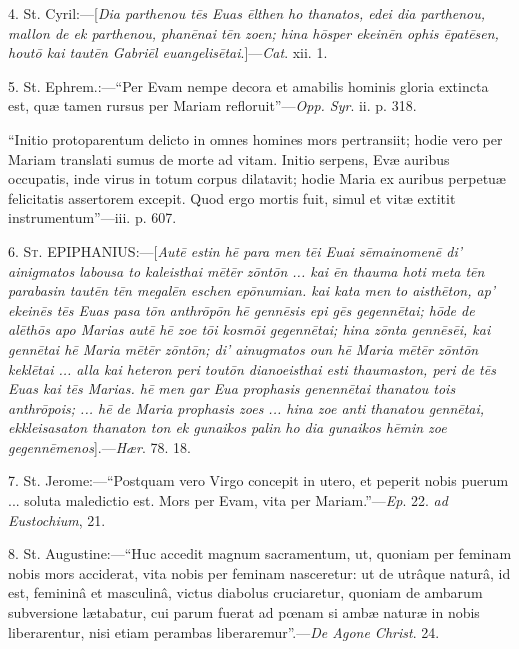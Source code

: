 4. St. Cyril:—[\emph{Dia parthenou t\={e}s Euas \={e}lthen ho
thanatos, edei dia parthenou, mallon de ek parthenou, phan\={e}nai t\={e}n
zoen; hina h\={o}sper ekein\={e}n ophis \={e}pat\={e}sen,
hout\={o} kai taut\={e}n Gabri\={e}l euangelis\={e}tai}.]—\emph{Cat}.
xii. 1.


5. St. Ephrem.:—``Per Evam nempe decora et amabilis hominis
gloria extincta est, quæ tamen rursus per Mariam refloruit''—\emph{Opp.
Syr}. ii. p. 318.


``Initio protoparentum delicto in omnes homines mors pertransiit;
hodie vero per Mariam translati sumus de morte ad vitam. Initio serpens,
Evæ auribus occupatis, inde virus in totum corpus dilatavit; hodie
Maria ex auribus perpetuæ felicitatis assertorem excepit. Quod
ergo mortis fuit, simul et vitæ extitit instrumentum''—iii. p.
607.


6. S\textsc{t}. EPIPHANIUS:—[\emph{Aut\={e}
estin h\={e} para men t\={e}i Euai s\={e}mainomen\={e} di'
ainigmatos
labousa to kaleisthai m\={e}t\={e}r z\={o}nt\={o}n ... kai \={e}n
thauma hoti meta t\={e}n parabasin taut\={e}n t\={e}n megal\={e}n
eschen ep\={o}numian. kai kata men to aisth\={e}ton, ap' ekein\={e}s
t\={e}s Euas pasa t\={o}n anthr\={o}p\={o}n h\={e} genn\={e}sis
epi g\={e}s gegenn\={e}tai; h\={o}de de al\={e}th\={o}s
apo Marias aut\={e} h\={e} zoe t\={o}i kosm\={o}i
gegenn\={e}tai; hina z\={o}nta genn\={e}s\={e}i, kai genn\={e}tai
h\={e} Maria m\={e}t\={e}r z\={o}nt\={o}n; di' ainugmatos
oun h\={e} Maria m\={e}t\={e}r z\={o}nt\={o}n kekl\={e}tai
... alla kai heteron peri tout\={o}n dianoeisthai esti thaumaston,
peri de t\={e}s Euas kai t\={e}s Marias. h\={e} men gar Eua
prophasis genenn\={e}tai thanatou tois anthr\={o}pois; ... h\={e}
de Maria prophasis zoes ... hina zoe anti thanatou genn\={e}tai,
ekkleisasaton thanaton ton ek gunaikos palin ho dia gunaikos h\={e}min
zoe gegenn\={e}menos}].—\emph{Hær}. 78. 18.


7. St. Jerome:—``Postquam vero Virgo concepit in utero, et
peperit nobis puerum ... soluta maledictio est. Mors per Evam, vita per
Mariam.''—\emph{Ep}. 22. \emph{ad Eustochium}, 21.


8. St. Augustine:—``Huc accedit magnum sacramentum, ut, quoniam
per feminam nobis mors acciderat, vita nobis per feminam nasceretur: ut
de utrâque naturâ, id est, femininâ et masculinâ, victus diabolus
cruciaretur, quoniam de ambarum subversione lætabatur, cui parum fuerat
ad pœnam si ambæ naturæ in nobis liberarentur, nisi etiam perambas
liberaremur''.—\emph{De Agone Christ}. 24.


